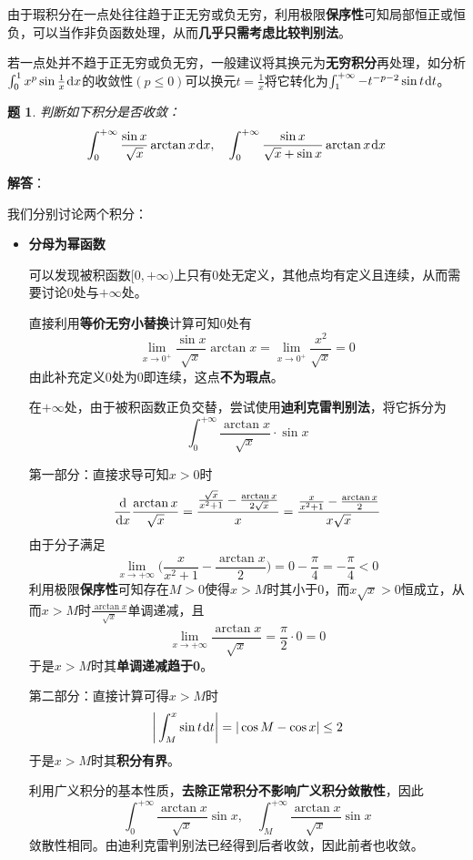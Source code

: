 \documentclass[a4paper,UTF8,fontset=windows,AutoFakeBold]{ctexart}
\newcommand*{\dr}{\hspace{0.07em}\mathrm{d}}
\newcommand*{\note}{\noindent *}
\theoremstyle{ex}
\newtheorem{exercise}{题}
\newcommand{\sol}[1]{{\vspace{5pt}\kaishu\noindent\textbf{解答}：\vspace{-3pt}
\begin{compactitem}
    \item[] #1
\end{compactitem}
}}
\begin{document}
\note 由于瑕积分在一点处往往趋于正无穷或负无穷，利用极限\textbf{保序性}可知局部恒正或恒负，可以当作非负函数处理，从而\textbf{几乎只需考虑比较判别法}。

\note 若一点处并不趋于正无穷或负无穷，一般建议将其换元为\textbf{无穷积分}再处理，如分析$\int_0^1x^p\sin\frac{1}{x}\dr x$的收敛性$(p\le0)$可以换元$t=\frac{1}{x}$将它转化为$\int_1^{+\infty}-t^{-p-2}\sin t\dr t$。

\begin{framed}
\begin{exercise}
    判断如下积分是否收敛：
    $$\int_0^{+\infty}\frac{\sin x}{\sqrt{x}}\arctan x\dr x,\quad\int_0^{+\infty}\frac{\sin x}{\sqrt{x}+\sin x}\arctan x\dr x$$
\end{exercise}
\sol{
    我们分别讨论两个积分：
    \begin{itemize}
        \item \textbf{分母为幂函数}
        
        可以发现被积函数$[0,+\infty)$上只有0处无定义，其他点均有定义且连续，从而需要讨论0处与$+\infty$处。

        直接利用\textbf{等价无穷小替换}计算可知0处有
        $$\lim_{x\to0^+}\frac{\sin x}{\sqrt{x}}\arctan x=\lim_{x\to0^+}\frac{x^2}{\sqrt{x}}=0$$
        由此补充定义0处为0即连续，这点\textbf{不为瑕点}。

        在$+\infty$处，由于被积函数正负交替，尝试使用\textbf{迪利克雷判别法}，将它拆分为
        $$\int_0^{+\infty}\frac{\arctan x}{\sqrt{x}}\cdot\sin x$$

        第一部分：直接求导可知$x>0$时
        $$\frac{\dr}{\dr x}\frac{\arctan x}{\sqrt{x}}=\frac{\frac{\sqrt{x}}{x^2+1}-\frac{\arctan x}{2\sqrt{x}}}{x}=\frac{\frac{x}{x^2+1}-\frac{\arctan x}{2}}{x\sqrt{x}}$$
        由于分子满足
        $$\lim_{x\to+\infty}\bigg(\frac{x}{x^2+1}-\frac{\arctan x}{2}\bigg)=0-\frac{\pi}{4}=-\frac{\pi}{4}<0$$
        利用极限\textbf{保序性}可知存在$M>0$使得$x>M$时其小于0，而$x\sqrt{x}>0$恒成立，从而$x>M$时$\frac{\arctan x}{\sqrt{x}}$单调递减，且
        $$\lim_{x\to+\infty}\frac{\arctan x}{\sqrt{x}}=\frac{\pi}{2}\cdot0=0$$
        于是$x>M$时其\textbf{单调递减趋于0}。

        第二部分：直接计算可得$x>M$时
        $$\bigg|\int_M^x\sin t\dr t\bigg|=|\cos M-\cos x|\le2$$
        于是$x>M$时其\textbf{积分有界}。

        利用广义积分的基本性质，\textbf{去除正常积分不影响广义积分敛散性}，因此
        $$\int_0^{+\infty}\frac{\arctan x}{\sqrt{x}}\sin x,\quad\int_M^{+\infty}\frac{\arctan x}{\sqrt{x}}\sin x$$
        敛散性相同。由迪利克雷判别法已经得到后者收敛，因此前者也收敛。


\end{itemize}}
\end{framed}
\end{document}
